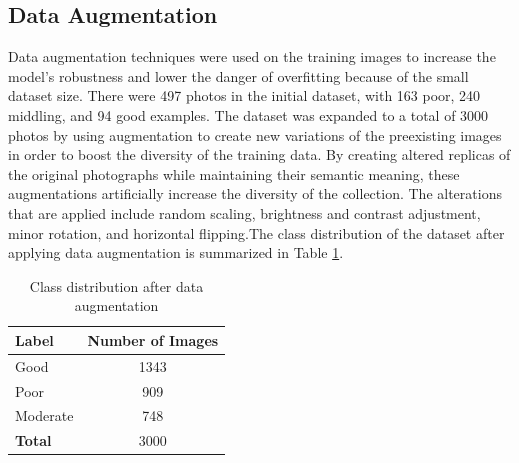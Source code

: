 \documentclass[11pt]{article}
\begin{document}
\subsection{Data Augmentation}
Data augmentation techniques were used on the training images to increase the model's robustness and lower the danger of overfitting because of the small dataset size. There were 497 photos in the initial dataset, with 163 poor, 240 middling, and 94 good examples. The dataset was expanded to a total of 3000 photos by using augmentation to create new variations of the preexisting images in order to boost the diversity of the training data. By creating altered replicas of the original photographs while maintaining their semantic meaning, these augmentations artificially increase the diversity of the collection. The alterations that are applied include random scaling, brightness and contrast adjustment, minor rotation, and horizontal flipping.The class distribution of the dataset after applying data augmentation is summarized in Table \ref{tab:augmented_distribution}.

\begin{table}[H]
\centering
\begin{tabular}{lc}
\hline
\textbf{Label} & \textbf{Number of Images} \\
\hline
Good & 1343 \\
Poor & 909 \\
Moderate & 748 \\
\hline
\textbf{Total} & 3000 \\
\hline
\end{tabular}
\caption{Class distribution after data augmentation}
\label{tab:augmented_distribution}
\end{table}
\end{document}
